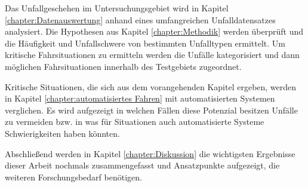 Das Unfallgeschehen im Untersuchungsgebiet wird in Kapitel \ref{chapter:Datenauswertung} anhand eines umfangreichen Unfalldatensatzes analysiert. Die Hypothesen aus Kapitel \ref{chapter:Methodik} werden überprüft und die Häufigkeit und Unfallschwere von bestimmten Unfalltypen ermittelt. Um kritische Fahrsituationen zu ermitteln werden die Unfälle kategorisiert und dann möglichen Fahrsituationen innerhalb des Testgebiets zugeordnet.

Kritische Situationen, die sich aus dem vorangehenden Kapitel ergeben, werden in Kapitel \ref{chapter:automatisiertes Fahren} mit automatisierten Systemen verglichen. Es wird aufgezeigt in welchen Fällen diese Potenzial besitzen Unfälle zu vermeiden bzw. in was für Situationen auch automatisierte Systeme Schwierigkeiten haben könnten. 

Abschließend werden in Kapitel \ref{chapter:Diskussion} die wichtigsten Ergebnisse dieser Arbeit nochmals zusammengefasst und Ansatzpunkte aufgezeigt, die weiteren Forschungsbedarf benötigen.